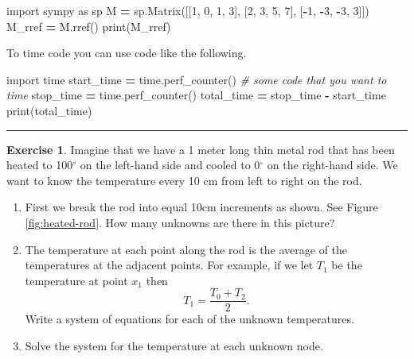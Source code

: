 \documentclass[
]{book}
\newenvironment{Shaded}{\begin{snugshade}}{\end{snugshade}}
\newcommand{\BuiltInTok}[1]{#1}
\newcommand{\CommentTok}[1]{\textcolor[rgb]{0.56,0.35,0.01}{\textit{#1}}}
\newcommand{\DecValTok}[1]{\textcolor[rgb]{0.00,0.00,0.81}{#1}}
\newcommand{\ImportTok}[1]{#1}
\newcommand{\NormalTok}[1]{#1}
\newcommand{\OperatorTok}[1]{\textcolor[rgb]{0.81,0.36,0.00}{\textbf{#1}}}
\theoremstyle{definition}
\theoremstyle{definition}
\theoremstyle{definition}
\newtheorem{exercise}{Exercise}[chapter]
\theoremstyle{remark}
\begin{document}
\begin{Shaded}
\begin{Highlighting}[]
\ImportTok{import}\NormalTok{ sympy }\ImportTok{as}\NormalTok{ sp}
\NormalTok{M }\OperatorTok{=}\NormalTok{ sp.Matrix([[}\DecValTok{1}\NormalTok{, }\DecValTok{0}\NormalTok{, }\DecValTok{1}\NormalTok{, }\DecValTok{3}\NormalTok{], [}\DecValTok{2}\NormalTok{, }\DecValTok{3}\NormalTok{, }\DecValTok{5}\NormalTok{, }\DecValTok{7}\NormalTok{], [}\OperatorTok{{-}}\DecValTok{1}\NormalTok{, }\OperatorTok{{-}}\DecValTok{3}\NormalTok{, }\OperatorTok{{-}}\DecValTok{3}\NormalTok{, }\DecValTok{3}\NormalTok{]]) }
\NormalTok{M\_rref }\OperatorTok{=}\NormalTok{ M.rref()   }
\BuiltInTok{print}\NormalTok{(M\_rref)}
\end{Highlighting}
\end{Shaded}

To time code you can use code like the following.

\begin{Shaded}
\begin{Highlighting}[]
\ImportTok{import}\NormalTok{ time}
\NormalTok{start\_time }\OperatorTok{=}\NormalTok{ time.perf\_counter()}
\CommentTok{\# some code that you want to time}
\NormalTok{stop\_time }\OperatorTok{=}\NormalTok{  time.perf\_counter()}
\NormalTok{total\_time }\OperatorTok{=}\NormalTok{ stop\_time }\OperatorTok{{-}}\NormalTok{ start\_time}
\BuiltInTok{print}\NormalTok{(total\_time)}
\end{Highlighting}
\end{Shaded}

\begin{center}\rule{0.5\linewidth}{0.5pt}\end{center}

\begin{exercise}
\protect\hypertarget{exr:heated-rod-lin-alg}{}{\label{exr:heated-rod-lin-alg} }Imagine that we have a 1 meter long thin metal rod that has been heated to 100\(^\circ\) on the left-hand side and cooled to 0\(^\circ\) on the right-hand side. We want to know the temperature every 10 cm from left to right on the rod.

\begin{enumerate}
\def\labelenumi{\alph{enumi}.}
\item
  First we break the rod into equal 10cm increments as shown. See Figure \ref{fig:heated-rod}. How many unknowns are there in this picture?
\item
  The temperature at each point along the rod is the average of the
  temperatures at the adjacent points. For example, if we let \(T_1\) be
  the temperature at point \(x_1\) then \[T_1 = \frac{T_0 + T_2}{2}.\]
  Write a system of equations for each of the unknown temperatures.
\item
  Solve the system for the temperature at each unknown node.
\end{enumerate}
\end{exercise}
\end{document}
